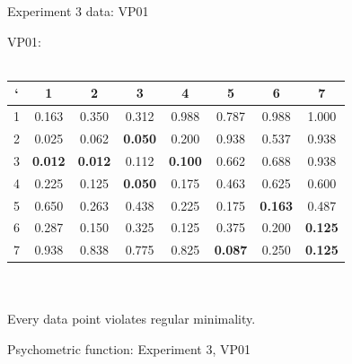 \documentclass{beamer}
\begin{document}
\begin{frame}[t]{Experiment 3 data: VP01}

VP01:\\
~\\
\begin{tabular}{c | c c c c c c c}
` & 1 & 2 & 3 & 4 & 5 & 6 & 7 \\ \hline

1 & {\color{red} 0.163} & 0.350 & 0.312 & 0.988 & 0.787 & 0.988 & 1.000\\

2 & {\color{red} 0.025} & 0.062 &{\bf 0.050}& 0.200 & 0.938 & 0.537 & 0.938\\

3 & {\bf \color{red} 0.012} & {\bf \color{red} 0.012} & 0.112 & {\bf 0.100} & 0.662 & 0.688 & 0.938\\

4 & 0.225 & 0.125 & {\bf \color{red} 0.050} & 0.175 & 0.463 & 0.625 & 0.600\\

5 & 0.650 & 0.263 & 0.438 & 0.225 & 0.175 & {\bf \color{red} 0.163} & 0.487\\

6 & 0.287 & 0.150 & 0.325 & {\color{red} 0.125} & 0.375 & 0.200 & {\bf \color{red} 0.125}\\

7 & 0.938 & 0.838 & 0.775 & 0.825 & {\bf \color{red} 0.087} & 0.250 & {\bf 0.125}\\

\end{tabular}
\\
~\\
Every data point violates regular minimality.
\end{frame}

\begin{frame}[t]{Psychometric function: Experiment 3, VP01}
\end{frame}
\end{document}
